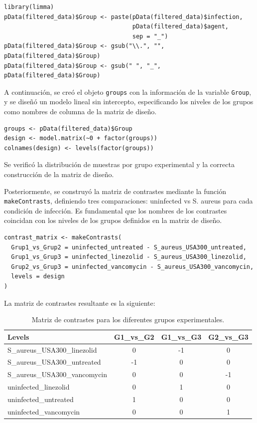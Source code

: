 \documentclass[12pt,a4paper]{article}
\begin{document}
\begin{verbatim}
library(limma)
pData(filtered_data)$Group <- paste(pData(filtered_data)$infection, 
                                    pData(filtered_data)$agent, 
                                    sep = "_")
pData(filtered_data)$Group <- gsub("\\.", "", pData(filtered_data)$Group)
pData(filtered_data)$Group <- gsub(" ", "_", pData(filtered_data)$Group)
\end{verbatim}

A continuación, se creó el objeto \texttt{groups} con la información de la variable \texttt{Group}, y se diseñó un modelo lineal sin intercepto, especificando los niveles de los grupos como nombres de columna de la matriz de diseño.

\begin{verbatim}
groups <- pData(filtered_data)$Group
design <- model.matrix(~0 + factor(groups))
colnames(design) <- levels(factor(groups))
\end{verbatim}

Se verificó la distribución de muestras por grupo experimental y la correcta construcción de la matriz de diseño.

Posteriormente, se construyó la matriz de contrastes mediante la función \texttt{makeContrasts}, definiendo tres comparaciones: uninfected vs S. aureus para cada condición de infección. Es fundamental que los nombres de los contrastes coincidan con los niveles de los grupos definidos en la matriz de diseño.

\begin{verbatim}
contrast_matrix <- makeContrasts(
  Grup1_vs_Grup2 = uninfected_untreated - S_aureus_USA300_untreated,
  Grup1_vs_Grup3 = uninfected_linezolid - S_aureus_USA300_linezolid,
  Grup2_vs_Grup3 = uninfected_vancomycin - S_aureus_USA300_vancomycin,
  levels = design
)
\end{verbatim}

La matriz de contrastes resultante es la siguiente:

\begin{table}[H]
\centering
\begin{tabular}{lccc}
\hline
\textbf{Levels} & \textbf{G1\_vs\_G2} & \textbf{G1\_vs\_G3} & \textbf{G2\_vs\_G3} \\
\hline
S\_aureus\_USA300\_linezolid & 0 & -1 & 0 \\
S\_aureus\_USA300\_untreated & -1 & 0 & 0 \\
S\_aureus\_USA300\_vancomycin & 0 & 0 & -1 \\
uninfected\_linezolid & 0 & 1 & 0 \\
uninfected\_untreated & 1 & 0 & 0 \\
uninfected\_vancomycin & 0 & 0 & 1 \\
\hline
\end{tabular}
\caption{Matriz de contrastes para los diferentes grupos experimentales.}
\end{table}
\end{document}

